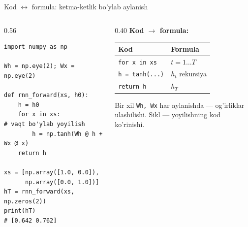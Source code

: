 \documentclass[aspectratio=169,11pt]{beamer}
\begin{document}
\begin{frame}[fragile]{Kod $\leftrightarrow$ formula: ketma-ketlik bo'ylab aylanish}
  \begin{columns}[T]
    \begin{column}{0.56\textwidth}
\begin{lstlisting}
import numpy as np

Wh = np.eye(2); Wx = np.eye(2)

def rnn_forward(xs, h0):
    h = h0
    for x in xs:                 # vaqt bo'ylab yoyilish
        h = np.tanh(Wh @ h + Wx @ x)
    return h

xs = [np.array([1.0, 0.0]),
      np.array([0.0, 1.0])]
hT = rnn_forward(xs, np.zeros(2))
print(hT)                        # [0.642 0.762]
\end{lstlisting}
    \end{column}
    \begin{column}{0.40\textwidth}
      \textbf{Kod $\to$ formula:}\\[3pt]
      \footnotesize
      \begin{tabular}{p{2.0cm}p{2.0cm}}
        \toprule
        Kod & Formula \\
        \midrule
        \texttt{for x in xs} & $t=1\ldots T$ \\
        \texttt{h = tanh(...)} & $h_t$ rekursiya \\
        \texttt{return h} & $h_T$ \\
        \bottomrule
      \end{tabular}
      \vspace{4pt}
      \begin{tcolorbox}[okbox,top=2pt,bottom=2pt]
        \footnotesize
        Bir xil \texttt{Wh, Wx} har aylanishda --- og'irliklar ulashilishi.
        Sikl --- yoyilishning kod ko'rinishi.
      \end{tcolorbox}
    \end{column}
  \end{columns}
\end{frame}
\end{document}
